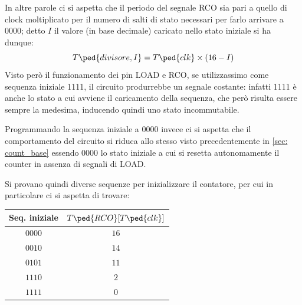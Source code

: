 \documentclass[10pt, a4paper, italian]{article}
\begin{document}
In altre parole ci si aspetta che il periodo del segnale RCO sia pari a
quello di clock moltiplicato per il numero di salti di stato necessari per
farlo arrivare a 0000; detto $I$ il valore (in base decimale) caricato nello
stato iniziale si ha dunque:
\begin{equation}
T\ped{divisore, I} = T\ped{clk} \times (16 - I)
\end{equation}
Visto però il funzionamento dei pin LOAD e RCO, se utilizzassimo come sequenza
iniziale 1111, il circuito produrrebbe un segnale costante: infatti 1111 è
anche lo stato a cui avviene il caricamento della sequenza, che però risulta
essere sempre la medesima, inducendo quindi uno stato incommutabile.

Programmando la sequenza iniziale a $0000$ invece ci si aspetta che il
comportamento del circuito si riduca allo stesso visto precedentemente in
\cref{sec: count_base} essendo 0000 lo stato iniziale a cui si resetta
autonomamente il counter in assenza di segnali di LOAD.

Si provano quindi diverse sequenze per inizializzare il contatore, per cui
in particolare ci si aspetta di trovare:
\begin{table}[htbp]
\centering
\begin{tabular}{c|c}
\toprule
Seq. iniziale & $T\ped{RCO} [T\ped{clk}]$\\
\midrule
$0000$ & $16$ \\
$0010$ & $14$ \\
$0101$ & $11$ \\
$1110$ & $2$ \\
$1111$ & $0$ \\
\bottomrule
\end{tabular}
\end{table}
\end{document}

